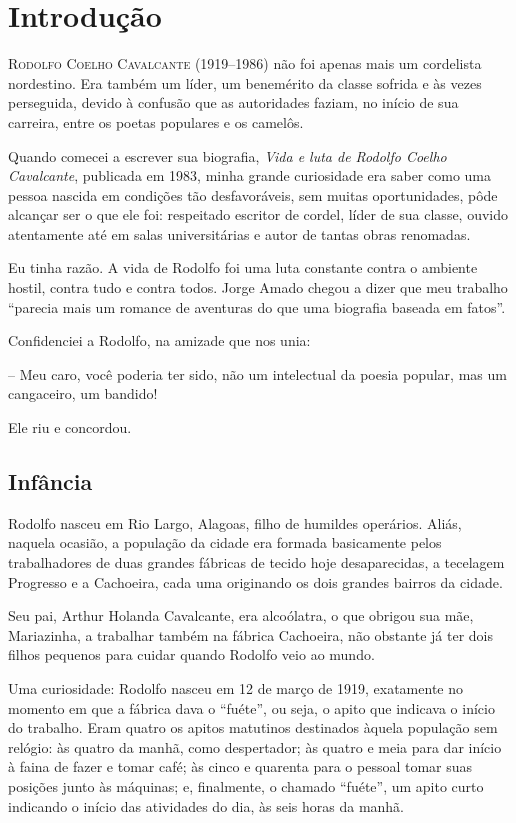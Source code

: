 
\chapter[Introdução, por Eno T. Wanke]{Introdução}

\textsc{Rodolfo Coelho Cavalcante} (1919--1986) não foi apenas mais um
cordelista nordestino. Era também um líder, um benemérito da classe
sofrida e às vezes perseguida, devido à confusão que as autoridades
faziam, no início de sua carreira, entre os poetas populares e os
camelôs.

Quando comecei a escrever sua biografia, \textit{Vida e luta de Rodolfo
Coelho Cavalcante}, publicada em 1983, minha grande curiosidade era
saber como uma pessoa nascida em condições tão desfavoráveis, sem
muitas oportunidades, pôde alcançar ser o que ele foi: respeitado
escritor de cordel, líder de sua classe, ouvido atentamente até em
salas universitárias e autor de tantas obras renomadas.

Eu tinha razão. A vida de Rodolfo foi uma luta constante contra o
ambiente hostil, contra tudo e contra todos. Jorge Amado chegou a dizer
que meu trabalho ``parecia mais um romance de aventuras do
que uma biografia baseada em fatos''.

Confidenciei a Rodolfo, na amizade que nos unia:

-- Meu caro, você poderia ter sido, não um intelectual da poesia
popular, mas um cangaceiro, um bandido!

Ele riu e concordou.

\section{Infância}

Rodolfo nasceu em Rio Largo, Alagoas, filho de humildes operários.
Aliás, naquela ocasião, a população da cidade era formada basicamente
pelos trabalhadores de duas grandes fábricas de tecido hoje
desaparecidas, a tecelagem Progresso e a Cachoeira, cada uma originando
os dois grandes bairros da cidade.

Seu pai, Arthur Holanda Cavalcante, era alcoólatra, o que obrigou sua
mãe, Mariazinha, a trabalhar também na fábrica Cachoeira, não obstante
já ter dois filhos pequenos para cuidar quando Rodolfo veio ao mundo.

Uma curiosidade: Rodolfo nasceu em 12 de março de 1919, exatamente no
momento em que a fábrica dava o ``fuéte'', ou
seja, o apito que indicava o início do trabalho. Eram quatro os apitos
matutinos destinados àquela população sem relógio: às quatro da manhã,
como despertador; às quatro e meia para dar início à faina de fazer e
tomar café; às cinco e quarenta para o pessoal tomar suas posições
junto às máquinas; e, finalmente, o chamado
``fuéte'', um apito curto indicando o início
das atividades do dia, às seis horas da manhã.

